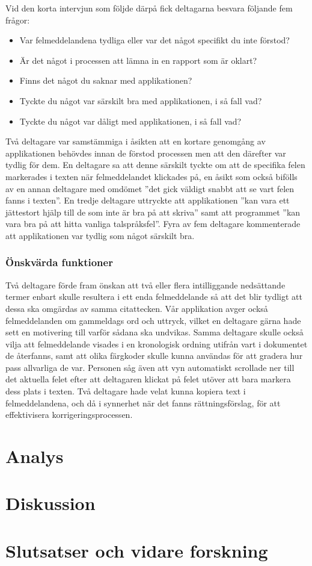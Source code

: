 \documentclass[swedish]{maucsthesis}
\begin{document}
Vid den korta intervjun som följde därpå fick deltagarna besvara följande fem
frågor:
\begin{itemize}
\item Var felmeddelandena tydliga eller var det något specifikt du inte förstod?
\item Är det något i processen att lämna in en rapport som är oklart?
\item Finns det något du saknar med applikationen?
\item Tyckte du något var särskilt bra med applikationen, i så fall vad?
\item Tyckte du något var dåligt med applikationen, i så fall vad?
\end{itemize}

Två deltagare var samstämmiga i åsikten att en kortare genomgång av
applikationen behövdes innan de förstod processen men att den därefter var
tydlig för dem. En deltagare sa att denne särskilt tyckte om att de specifika
felen markerades i texten när felmeddelandet klickades på, en åsikt som också
bifölls av en annan deltagare med omdömet ”det gick väldigt snabbt att se vart
felen fanns i texten”. En tredje deltagare uttryckte att applikationen ”kan vara
ett jättestort hjälp till de som inte är bra på att skriva” samt att programmet
”kan vara bra på att hitta vanliga talspråksfel”. Fyra av fem deltagare
kommenterade att applikationen var tydlig som något särskilt bra.

\subsubsection{Önskvärda funktioner}

Två deltagare förde fram önskan att två eller flera intilliggande nedsättande
termer enbart skulle resultera i ett enda felmeddelande så att det blir tydligt
att dessa ska omgärdas av samma citattecken. Vår applikation avger också
felmeddelanden om gammeldags ord och uttryck, vilket en deltagare gärna hade
sett en motivering till varför sådana ska undvikas. Samma deltagare skulle också
vilja att felmeddelande visades i en kronologisk ordning utifrån vart i
dokumentet de återfanns, samt att olika färgkoder skulle kunna användas för att
gradera hur pass allvarliga de var. Personen såg även att vyn automatiskt
scrollade ner till det aktuella felet efter att deltagaren klickat på felet
utöver att bara markera dess plats i texten. Två deltagare hade velat kunna
kopiera text i felmeddelandena, och då i synnerhet när det fanns
rättningsförslag, för att effektivisera korrigeringsprocessen.

\section{Analys}

\section{Diskussion}

\section{Slutsatser och vidare forskning}


%
\newpage
{}


\end{document}
